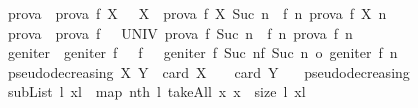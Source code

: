 \begin{isabellebody}
\isamarkupfalse%
%
\endisatagproof
{\isafoldproof}%
%
\isadelimproof
\isanewline
%
\endisadelimproof
\isanewline
\isanewline
\isanewline
\isanewline
\isanewline
\isanewline
\isanewline
\isanewline
\isanewline
\isanewline
\isanewline
\isanewline
\isanewline
\isanewline
\isanewline
\isanewline
\isanewline
\isanewline
\isanewline
\isanewline
\isanewline
\isanewline
\isanewline
\isanewline
\isanewline
\isanewline
\isanewline
\isanewline
\isanewline
\isanewline
\isanewline
\isanewline
\isanewline
\isanewline
\isanewline
\isanewline
\isanewline
\isanewline
\isanewline
\isanewline
{}\isamarkupfalse%
\ prova\ \ {\isachardoublequoteopen}prova\ f\ X\ {}\ {\isacharequal}\ X{\isachardoublequoteclose}\ {\isacharbar}\ {\isachardoublequoteopen}prova\ f\ X\ {\isacharparenleft}Suc\ n{\isacharparenright}\ {\isacharequal}\ f\ n\ {\isacharparenleft}prova\ f\ X\ n{\isacharparenright}{\isachardoublequoteclose}\isanewline
\isanewline
{}\isamarkupfalse%
\ prova{}\ \ {\isachardoublequoteopen}prova{}\ f\ {}\ {\isacharequal}\ UNIV{\isachardoublequoteclose}\ {\isacharbar}{\isachardoublequoteopen}prova{}\ f\ {\isacharparenleft}Suc\ n{\isacharparenright}\ {\isacharequal}\ f\ n\ {\isacharparenleft}prova{}\ f\ n{\isacharparenright}{\isachardoublequoteclose}\isanewline
\isanewline
{}\isamarkupfalse%
\ geniter\ \ {\isachardoublequoteopen}geniter\ f\ {}\ {\isacharequal}\ f\ {}{\isachardoublequoteclose}\ {\isacharbar}\ {\isachardoublequoteopen}geniter\ f\ {\isacharparenleft}Suc\ n{\isacharparenright}{\isacharequal}{\isacharparenleft}f\ {\isacharparenleft}Suc\ n{\isacharparenright}{\isacharparenright}\ o\ {\isacharparenleft}geniter\ f\ n{\isacharparenright}{\isachardoublequoteclose}\isanewline
\isanewline
{}\isamarkupfalse%
\ {\isachardoublequoteopen}pseudodecreasing\ X\ Y\ {\isacharequal}{\isacharequal}\ card\ X\ {\isacharminus}\ {}\ {\isasymle}\ card\ Y\ {\isacharminus}\ {}{\isachardoublequoteclose}\isanewline
\isanewline
{}\isamarkupfalse%
\ pseudodecreasing\ {\isacharparenleft}\ {\isachardoublequoteopen}{\isacharless}{\isachartilde}{\isachardoublequoteclose}\ {}{}{\isacharparenright}\isanewline
\isanewline
{}\isamarkupfalse%
\ {\isachardoublequoteopen}subList\ l\ xl\ {\isacharequal}{\isacharequal}\ map\ {\isacharparenleft}nth\ l{\isacharparenright}\ {\isacharparenleft}takeAll\ {\isacharparenleft}{\isacharpercent}x{\isachardot}\ x\ {\isasymle}\ size\ l{\isacharparenright}\ xl{\isacharparenright}{\isachardoublequoteclose}\isanewline

\end{isabellebody}
